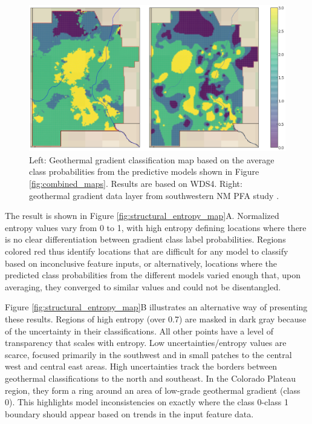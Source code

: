 \begin{figure}[!htp]
\centering
\includegraphics[width=\textwidth]{templates/images/Figure-Average_Gradient_Map_Joint.png}
\caption[Probability-averaged prediction map]{Left: Geothermal gradient classification map based on the average class probabilities from the predictive models shown in Figure \ref{fig:combined_maps}. Results are based on WDS4. Right: geothermal gradient data layer from southwestern NM PFA study \protect\citep{bielicki_hydrogeolgic_2015}.}
\label{fig:avg_final_map}
\end{figure}

The result is shown in Figure \ref{fig:structural_entropy_map}A. Normalized entropy values vary from 0 to 1, with high entropy defining locations where there is no clear differentiation between gradient class label probabilities. Regions colored red thus identify locations that are difficult for any model to classify based on inconclusive feature inputs, or alternatively, locations where the predicted class probabilities from the different models varied enough that, upon averaging, they converged to similar values and could not be disentangled.

Figure \ref{fig:structural_entropy_map}B illustrates an alternative way of presenting these results. Regions of high entropy (over 0.7) are masked in dark gray because of the uncertainty in their classifications. All other points have a level of transparency that scales with entropy. Low uncertainties/entropy values are scarce, focused primarily in the southwest and in small patches to the central west and central east areas. High uncertainties track the borders between geothermal classifications to the north and southeast. In the Colorado Plateau region, they form a ring around an area of low-grade geothermal gradient (class 0). This highlights model inconsistencies on exactly where the class 0-class 1 boundary should appear based on trends in the input feature data.

